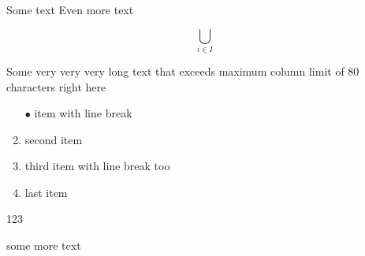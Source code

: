 \documentclass{minimal}
\begin{document}
Some text
Even more text

\[
    \bigcup_{i \in I}
\]

Some very very very long text that exceeds maximum column limit of 80 characters right here

\begin{enumerate}
    \item[$\bullet$] item
        with line break
    \item second item
    \item third item
        with line break too
    \item last item
\end{enumerate}

123

some more text
\end{document}
